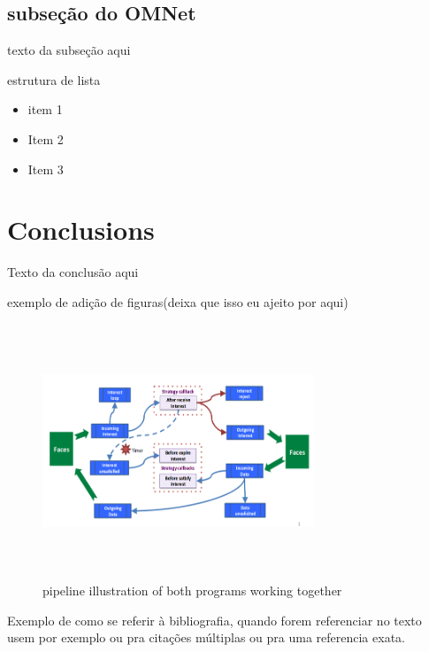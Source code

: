 \documentclass[10pt,conference]{./IEEEtran}
\begin{document}
	\subsection{subseção do OMNet}
	texto da subseção aqui


estrutura de lista
\begin{itemize}
		\item item 1
		
		\item Item 2
		
		\item Item 3
		
	\end{itemize}


	\section{Conclusions} 
	Texto da conclusão aqui \par
		
		
		exemplo de adição de figuras(deixa que isso eu ajeito por aqui)
		\begin{figure}[ht]
			\centering
			\includegraphics[height=3in, width=3.2in]{./Figures/Pipeline}
			\caption{pipeline illustration of both programs working together}
			\label{fig:not_congested_results1}
		\end{figure} 


Exemplo de como se referir à bibliografia, quando forem referenciar no texto usem por exemplo \cite{Cisco15} ou \cite{Cisco15, Xylomenos14} pra citações múltiplas ou \cite[chapter, p.~115]{Cisco15} pra uma referencia exata.
\end{document}
